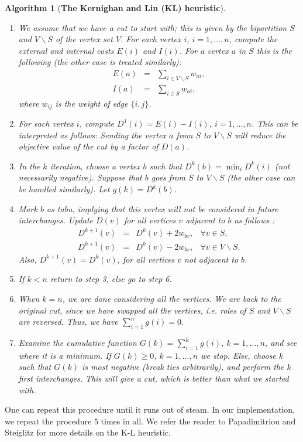 \documentclass[12pt]{article}
\newtheorem{algorithm1}{Algorithm}
\newenvironment{algorithm}[1]{\begin{algorithm1}[#1]~\\
    \vspace{-0.5cm}}{\end{algorithm1}}
\begin{document}
\begin{algorithm}
{\bf The Kernighan and Lin (KL) heuristic}
\begin{enumerate}
\item We assume that we have a cut to start with; this is given by
the bipartition $S$ and $V \backslash S$ of the vertex set $V$.
For each vertex $i$, $i=1,\ldots,n$, compute the external and
internal costs $E(i)$ and $I(i)$. For a vertex $a$ in $S$ this is
the following (the other case is treated similarly):
\begin{displaymath}
\begin{array}{ccc}
E(a) & = & \displaystyle \sum_{i \in V \backslash S} w_{ai}, \\
I(a) & = & \displaystyle \sum_{i \in S} w_{ai},
\end{array}
\end{displaymath}
where $w_{ij}$ is the weight of edge $\{i,j\}$. \item For each
vertex $i$, compute $D^1(i) = E(i) - I(i)$, $i=1,\ldots,n$. This
can be interpreted as follows: Sending the vertex $a$ from $S$ to
$V \backslash S$ will reduce the objective value of the cut by a
factor of $D(a)$. \item In the $k$ iteration, choose a vertex $b$
such that $D^k(b) = \min_i D^k(i)$ (not necessarily negative).
Suppose that $b$ goes from $S$ to $ V \backslash S$ (the other
case can be handled similarly). Let $g(k) = D^k(b)$. \item Mark
$b$ as {\em tabu}, implying that this vertex will not be
considered in future interchanges. Update $D(v)$ for all vertices
$v$ adjacent to $b$ as follows :
\begin{displaymath}
\begin{array}{cccc}
D^{k+1}(v) & = & D^k(v) + 2w_{bv}, & \forall v \in S, \\
D^{k+1}(v) & = & D^k(v) - 2w_{bv}, & \forall v \in V \backslash S.
\end{array}
\end{displaymath}
Also, $D^{k+1}(v) = D^k(v)$, for all vertices $v$ not adjacent to
$b$. \item If $k < n$ return to step 3, else go to step 6. \item
When $k=n$, we are done considering all the vertices. We are back
to the original cut, since we have swapped all the vertices, i.e.
roles of $S$ and $V \backslash S$ are reversed. Thus, we have
$\sum_{i=1}^ng(i) = 0$. \item Examine the cumulative function
$G(k) = \sum_{i=1}^kg(i)$, $k=1,\ldots,n$, and see where it is a
minimum. If $G(k) \ge 0$, $k=1,\ldots,n$ we stop. Else, choose $k$
such that $G(k)$ is most negative (break ties arbitrarily), and
perform the $k$ first interchanges. This will give a cut, which is
better than what we started with. \end{enumerate}\end{algorithm}
 One can repeat
this procedure until it runs out of steam. In our implementation,
we repeat the procedure $5$ times in all. We refer the reader to
Papadimitriou and Steiglitz \cite{papadimitriou_steiglitz} for
more details on the K-L heuristic.
\end{document}
